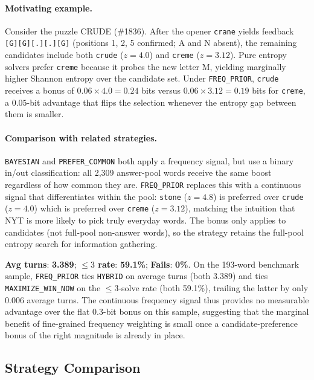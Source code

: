 \documentclass{article}
\begin{document}
\paragraph{Motivating example.}
Consider the puzzle CRUDE (\#1836). After the opener \texttt{crane} yields
feedback \texttt{[G][G][.][.][G]} (positions 1, 2, 5 confirmed; A and N absent),
the remaining candidates include both \texttt{crude} ($z = 4.0$) and
\texttt{creme} ($z = 3.12$). Pure entropy solvers prefer \texttt{creme} because
it probes the new letter M, yielding marginally higher Shannon entropy over the
candidate set. Under \texttt{FREQ\_PRIOR}, \texttt{crude} receives a bonus of
$0.06 \times 4.0 = 0.24$ bits versus $0.06 \times 3.12 = 0.19$ bits for
\texttt{creme}, a $0.05$-bit advantage that flips the selection whenever the
entropy gap between them is smaller.

\paragraph{Comparison with related strategies.}
\texttt{BAYESIAN} and \texttt{PREFER\_COMMON} both apply a frequency signal, but
use a binary in/out classification: all 2,309 answer-pool words receive the same
boost regardless of how common they are. \texttt{FREQ\_PRIOR} replaces this with
a continuous signal that differentiates within the pool: \texttt{stone} ($z=4.8$)
is preferred over \texttt{crude} ($z=4.0$) which is preferred over \texttt{creme}
($z=3.12$), matching the intuition that NYT is more likely to pick truly everyday
words. The bonus only applies to candidates (not full-pool non-answer words), so
the strategy retains the full-pool entropy search for information gathering.

\textbf{Avg turns}: \textbf{3.389}; \textbf{$\leq 3$ rate}: \textbf{59.1\%};
\textbf{Fails}: \textbf{0\%}. On the 193-word benchmark sample, \texttt{FREQ\_PRIOR}
ties \texttt{HYBRID} on average turns (both 3.389) and ties \texttt{MAXIMIZE\_WIN\_NOW}
on the $\leq 3$-solve rate (both 59.1\%), trailing the latter by only 0.006
average turns. The continuous frequency signal thus provides no measurable
advantage over the flat $0.3$-bit bonus on this sample, suggesting that the
marginal benefit of fine-grained frequency weighting is small once a
candidate-preference bonus of the right magnitude is already in place.

\subsection{Strategy Comparison}
\label{sec:strategy-comparison}
\end{document}
